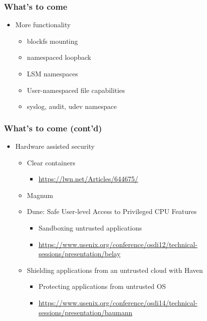 \documentclass{beamer}
\begin{document}
\begin{frame}
\frametitle{What's to come}
\begin{itemize}
\item More functionality
  \begin{itemize}
  \item blockfs mounting
  \item namespaced loopback
  \item LSM namespaces
  \item User-namespaced file capabilities
  \item syslog, audit, udev namespace
  \end{itemize}
\end{itemize}
\end{frame}

\begin{frame}
\frametitle{What's to come (cont'd)}
\begin{itemize}
\item Hardware assisted security
  \begin{itemize}
  \item Clear containers
    \begin{itemize}
    \item {\tiny \url{https://lwn.net/Articles/644675/}}
    \end{itemize}
  \item Magnum
  \item Dune: Safe User-level Access to Privileged CPU Features \\
    \begin{itemize}
    \item Sandboxing untrusted applications
    \item {\tiny \url{https://www.usenix.org/conference/osdi12/technical-sessions/presentation/belay}}
    \end{itemize}
  \item Shielding applications from an untrusted cloud with Haven \\
    \begin{itemize}
    \item Protecting applications from untrusted OS
    \item {\tiny \url{https://www.usenix.org/conference/osdi14/technical-sessions/presentation/baumann}}
    \end{itemize}
  \end{itemize}
\end{itemize}

\end{frame}



\end{document}
